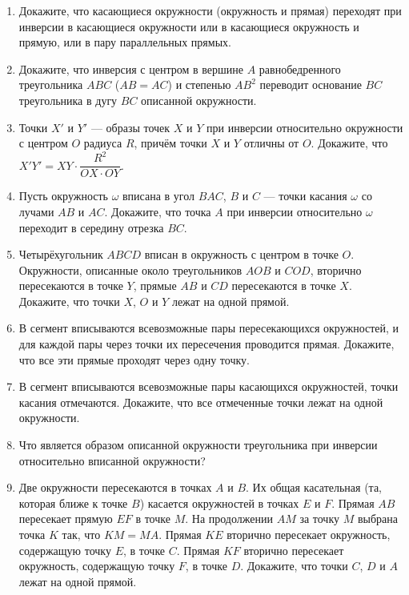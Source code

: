 \documentclass{article}
\begin{document}
\begin{enumerate}[label*=\protect\fbox{\arabic{enumi}}]
\item Докажите, что касающиеся окружности (окружность и прямая) переходят при инверсии в касающиеся окружности или в касающиеся окружность и прямую, или в пару параллельных прямых.

\item Докажите, что инверсия с центром в вершине $A$ равнобедренного треугольника $ABC$ ($AB = AC$) и степенью $AB^2$ переводит основание $BC$ треугольника в дугу $BC$ описанной окружности.

\item Точки $X'$ и $Y'$ — образы точек $X$ и $Y$ при инверсии относительно окружности с центром $O$ радиуса $R$, причём точки $X$ и $Y$ отличны от $O$. Докажите, что $X'Y' =XY \cdot \dfrac{R^2}{OX\cdot OY}$.

\item Пусть окружность $\omega$ вписана в угол $BAC$, $B$ и $C$ — точки касания $\omega$ со лучами $AB$ и $AC$. Докажите, что точка $A$ при инверсии относительно $\omega$ переходит в середину отрезка $BC$.

\item Четырёхугольник $ABCD$ вписан в окружность с центром в точке $O$. Окружности, описанные около треугольников $AOB$ и $COD$, вторично пересекаются в точке $Y$, прямые $AB$ и $CD$ пересекаются в точке $X$. Докажите, что точки $X$, $O$ и $Y$ лежат на одной прямой.

\item В сегмент вписываются всевозможные пары пересекающихся окружностей, и для каждой пары через точки их пересечения проводится прямая. Докажите, что все эти прямые проходят через одну точку.

\item В сегмент вписываются всевозможные пары касающихся окружностей, точки касания отмечаются. Докажите, что все отмеченные точки лежат на одной окружности.

\item Что является образом описанной окружности треугольника при инверсии относительно вписанной окружности?

\item Две окружности пересекаются в точках $A$ и $B$. Их общая касательная (та, которая ближе к точке $B$) касается окружностей в точках $E$ и $F$. Прямая $AB$ пересекает прямую $EF$ в точке $M$. На продолжении $AM$ за точку $M$ выбрана точка $K$ так, что $KM = MA$. Прямая $KE$ вторично пересекает окружность, содержащую точку $E$, в точке $C$. Прямая $KF$ вторично пересекает окружность, содержащую точку $F$, в точке $D$. Докажите, что точки $C$, $D$ и $A$ лежат на одной прямой.


\end{enumerate}
\end{document}
